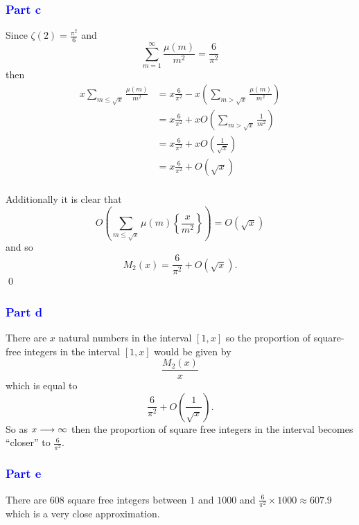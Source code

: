 \documentclass{unswmaths}
\begin{document}
\subsubsection*{\textcolor{blue}{Part c}}

Since $ \zeta(2) = \frac{\pi^2}{6} $ and 
$$
	\sum_{m=1}^{\infty} \frac{\mu(m)}{m^2} = \frac{6}{\pi^2}
$$
then 
\begin{align*}
	x \sum_{m \leq \sqrt{x}} \frac{\mu(m)}{m^2} &= x \frac{6}{\pi^2} - x \left( \sum_{m > \sqrt{x}} \frac{\mu(m)}{m^2} \right) \\
		&= x\frac{6}{\pi^2} + xO\left( \sum_{m>\sqrt{x}} \frac{1}{m^2} \right) \\
		&= x\frac{6}{\pi^2} + xO\left( \frac{1}{\sqrt{x}} \right) \\
		&= x\frac{6}{\pi^2} + O\left( \sqrt{x} \right) \\
\end{align*}

Additionally it is clear that 
$$
O\left(\sum_{m \leq \sqrt{x}} \mu(m) \left\{ \frac{x}{m^2} \right\}\right) = O(\sqrt{x})
$$
and so 
$$
	M_2(x) = \frac{6}{\pi^2} + O(\sqrt{x}).
$$
\qed

\subsubsection*{\textcolor{blue}{Part d}}
There are $ x $ natural numbers in the interval  $ [1, x] $ so the proportion of square-free integers in the interval 
$ [1, x] $ would be given by 
$$
	\frac{M_2(x)}{x}
$$
which is equal to 
$$
	\frac{6}{\pi^2} + O\left(\frac{1}{\sqrt{x}}\right).
$$
So as $ x \longrightarrow \infty $ then the proportion of square free integers in the interval becomes ``closer'' to 
$ \frac{6}{\pi^2} $.
\subsubsection*{\textcolor{blue}{Part e}}

There are 608 square free integers between $ 1 $ and $ 1000 $ and $ \frac{6}{\pi^2} \times 1000 \approx 607.9 $
which is a very close approximation.
\end{document}
